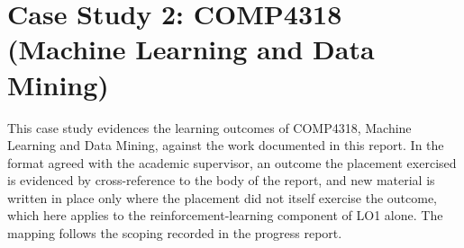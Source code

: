%

\section{Case Study 2: COMP4318 (Machine Learning and Data Mining)}
\label{app:comp4318}

This case study evidences the learning outcomes of COMP4318, Machine
Learning and Data Mining, against the work documented in this report. In
the format agreed with the academic supervisor, an outcome the placement
exercised is evidenced by cross-reference to the body of the report, and
new material is written in place only where the placement did not itself
exercise the outcome, which here applies to the reinforcement-learning
component of LO1 alone. The mapping follows the scoping recorded in the
progress report.

